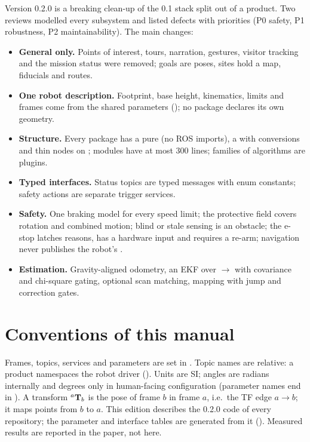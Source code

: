 Version 0.2.0 is a breaking clean-up of the 0.1 stack split out of a product. Two reviews
modelled every subsystem and listed defects with priorities (P0 safety, P1 robustness, P2
maintainability). The main changes:
\begin{itemize}
  \item \textbf{General only.} Points of interest, tours, narration, gestures, visitor tracking
    and the mission status were removed; goals are poses, sites hold a map, fiducials and
    routes.
  \item \textbf{One robot description.} Footprint, base height, kinematics, limits and frames
    come from the shared  parameters (); no package declares
    its own geometry.
  \item \textbf{Structure.} Every package has a pure  (no ROS imports), a
     with conversions and thin nodes on ; modules have at most
    300 lines; families of algorithms are plugins.
  \item \textbf{Typed interfaces.} Status topics are typed messages with enum constants;
    safety actions are separate trigger services.
  \item \textbf{Safety.} One braking model for every speed limit; the protective field covers
    rotation and combined motion; blind or stale sensing is an obstacle; the e-stop latches
    reasons, has a hardware input and requires a re-arm; navigation never publishes the
    robot's .
  \item \textbf{Estimation.} Gravity-aligned odometry, an EKF over $\to$ with
    covariance and chi-square gating, optional scan matching, mapping with jump and correction
    gates.
\end{itemize}

\section{Conventions of this manual}

Frames, topics, services and parameters are set in . Topic names are
relative: a product namespaces the robot driver (). Units are SI; angles
are radians internally and degrees only in human-facing configuration (parameter names end in
). A transform ${}^{a}\mathbf{T}_{b}$ is the pose of frame $b$ in frame $a$, i.e.\ the TF edge
$a \to b$; it maps points from $b$ to $a$. This edition describes the 0.2.0 code of every
repository; the parameter and interface tables are generated from it
(). Measured results are reported in the paper, not here.

